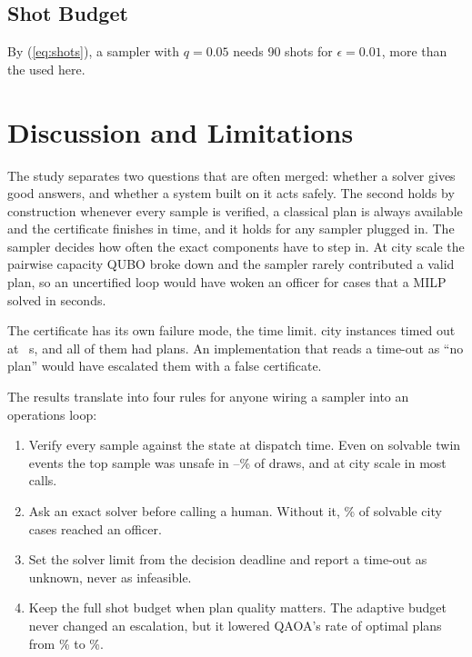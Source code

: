 \documentclass[conference]{IEEEtran}
\begin{document}
\subsection{Shot Budget}
\ShotText{} By (\ref{eq:shots}), a sampler with $q=0.05$ needs 90 shots for $\epsilon=0.01$, more than the \Shots{} used here.

\section{Discussion and Limitations}
The study separates two questions that are often merged: whether a solver gives good answers, and whether a system built on it acts safely. The second holds by construction whenever every sample is verified, a classical plan is always available and the certificate finishes in time, and it holds for any sampler plugged in. The sampler decides how often the exact components have to step in. At city scale the pairwise capacity QUBO broke down and the sampler rarely contributed a valid plan, so an uncertified loop would have woken an officer for cases that a MILP solved in seconds.

The certificate has its own failure mode, the time limit. \CityTimeout{} city instances timed out at \CityLimitS~s, and all of them had plans. An implementation that reads a time-out as ``no plan'' would have escalated them with a false certificate.

The results translate into four rules for anyone wiring a sampler into an operations loop:
\begin{enumerate}
\item Verify every sample against the state at dispatch time. Even on solvable twin events the top sample was unsafe in \TwinRawFeasSA--\TwinRawFeasQ\% of draws, and at city scale in most calls.
\item Ask an exact solver before calling a human. Without it, \CityFalseEsc\% of solvable city cases reached an officer.
\item Set the solver limit from the decision deadline and report a time-out as unknown, never as infeasible.
\item Keep the full shot budget when plan quality matters. The adaptive budget never changed an escalation, but it lowered QAOA's rate of optimal plans from \FixedOptQ\% to \AdaptOptQ\%.
\end{enumerate}
\end{document}
